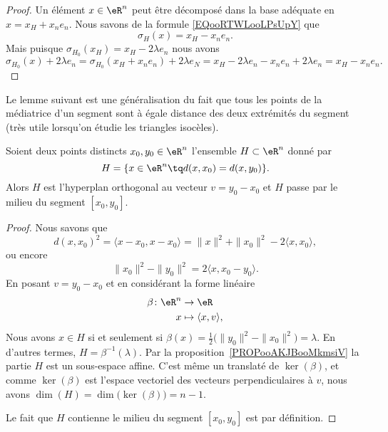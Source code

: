 \begin{proof}
	Un élément \( x\in \eR^n\) peut être décomposé dans la base adéquate en \( x=x_H+x_ne_n\). Nous savons de la formule \eqref{EQooRTWLooLPsUpY} que
	\begin{equation}
		\sigma_H(x)=x_H-x_ne_n.
	\end{equation}
	Mais puisque \( \sigma_{H_0}(x_H)=x_H-2\lambda e_n\) nous avons
	\begin{equation}
		\sigma_{H_0}(x)+2\lambda e_n=\sigma_{H_0}(x_H+x_ne_n)+2\lambda e_N=x_H-2\lambda e_n-x_ne_n+2\lambda e_n=x_H-x_ne_n.
	\end{equation}
\end{proof}

Le lemme suivant est une généralisation du fait que tous les points de la médiatrice d'un segment sont à égale distance des deux extrémités du segment (très utile lorsqu'on étudie les triangles isocèles).
\begin{lemma}        \label{LEMooDPLYooJKZxiM}
	Soient deux points distincts \( x_0,y_0\in \eR^n\) l'ensemble \( H\subset \eR^n\) donné par
	\begin{equation}
		H=\{ x\in \eR^n\tq d(x,x_0)=d(x,y_0) \}.
	\end{equation}
	Alors \( H\) est l'hyperplan orthogonal au vecteur \( v=y_0-x_0\) et \( H\) passe par le milieu du segment \( [x_0,y_0] \).
\end{lemma}

\begin{proof}
	Nous savons que
	\begin{equation}
		d(x,x_0)^2=\langle x-x_0, x-x_0\rangle =\| x \|^2+\| x_0 \|^2-2\langle x, x_0\rangle,
	\end{equation}
	ou encore
	\begin{equation}
		\| x_0 \|^2-\| y_0 \|^2=2\langle x, x_0-y_0\rangle .
	\end{equation}
	En posant \( v=y_0-x_0\) et en considérant la forme linéaire
	\begin{equation}
		\begin{aligned}
			\beta\colon \eR^n & \to \eR                       \\
			x                 & \mapsto \langle x, v\rangle ,
		\end{aligned}
	\end{equation}
	Nous avons \( x\in H\) si et seulement si \( \beta(x)=\frac{ 1 }{2}\big( \| y_0 \|^2-\| x_0 \|^2 \big)=\lambda\). En d'autres termes, \( H=\beta^{-1}(\lambda)\). Par la proposition~\ref{PROPooAKJBooMkmsiV} la partie \( H\) est un sous-espace affine. C'est même un translaté de \( \ker(\beta)\), et comme \( \ker(\beta)\) est l'espace vectoriel des vecteurs perpendiculaires à \( v\), nous avons \( \dim(H)=\dim\big( \ker(\beta) \big)=n-1\).

	Le fait que \( H\) contienne le milieu du segment \( [x_0,y_0]\) est par définition.
\end{proof}

